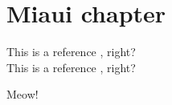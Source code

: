 \chapter{Miaui chapter}
\label{ch:sample-chapter}

This is a reference , right?\\


This is a reference , right?\\




Meow!
